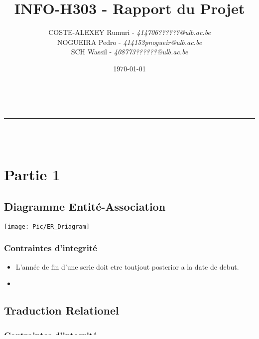 \documentclass[12pt,a4paper]{article}
\makeatletter
\newcommand{\linha}{\rule{\linewidth}{0.4mm}}
\renewcommand{\maketitle}{
\begin{center}
\vspace{2ex}
{\huge\textsc{\@title}}
\vspace{1ex}\\
\linha\\
\@author\\\@date
\vspace{4ex}
\end{center}
}
\makeatother
\begin{document}
	\title{INFO-H303 - Rapport du Projet}
	\author{
		COSTE-ALEXEY Rumuri - \emph{414706}\hfill\textit{??????@ulb.ac.be}\\
		NOGUEIRA Pedro - \emph{414153}\hfill\textit{pnogueir@ulb.ac.be}\\
		SCH Wassil - \emph{408773}\hfill\textit{??????@ulb.ac.be}
	}
	\date{\today}
	\maketitle



	\section*{Partie 1}

		\subsection*{Diagramme Entité-Association}
			\begin{center}
				\texttt{[image: Pic/ER\_Driagram]}
			\end{center}

			\subsubsection*{Contraintes d'integrité}
				\begin{itemize}
					\item L'année de fin d'une serie doit etre toutjout posterior a la date de debut.
					\item 
				\end{itemize}



		\subsection*{Traduction Relationel}

			\subsubsection*{Contraintes d'integrité}
				\begin{itemize}
					\item
					\item
				\end{itemize}



		\subsection*{Hypothèses et Justifications}
			Dans l'enoncé il est precisé que chaque acteur a un nom, prenom et genre. Rien est dit a propos des directeurs ni des autheurs. On a supposé qu'ils ont aussi un nom, premon et genre.
			Une personne peut etre autheur, directeur et acteur de pluisieurs filmes et une personne peut avoir pluisieurs roles (ex: author et actor) dans un meme filme.\par
\end{document}
